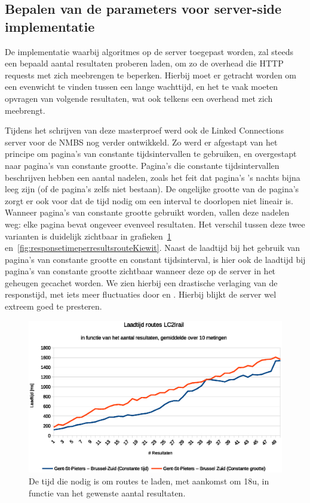 \subsection{Bepalen van de parameters voor server-side implementatie}

De implementatie waarbij algoritmes op de server toegepast worden, zal steeds een bepaald aantal resultaten proberen laden, om zo de overhead die HTTP requests met zich meebrengen te beperken. Hierbij moet er getracht worden om een evenwicht te vinden tussen een lange wachttijd, en het te vaak moeten opvragen van volgende resultaten, wat ook telkens een overhead met zich meebrengt.

Tijdens het schrijven van deze masterproef werd ook de Linked Connections server voor de NMBS nog verder ontwikkeld. Zo werd er afgestapt van het principe om pagina's van constante tijdsintervallen te gebruiken, en overgestapt naar pagina's van constante grootte. Pagina's die constante tijdsintervallen beschrijven hebben een aantal nadelen, zoals het feit dat pagina's 's nachts bijna leeg zijn (of de pagina's zelfs niet bestaan). De ongelijke grootte van de pagina's zorgt er ook voor dat de tijd nodig om een interval te doorlopen niet lineair is. Wanneer pagina's van constante grootte gebruikt worden, vallen deze nadelen weg: elke pagina bevat ongeveer evenveel resultaten. Het verschil tussen deze twee varianten is duidelijk zichtbaar in grafieken~\ref{fig:responsetimeperresultsrouteBruSouth} en~\ref{fig:responsetimeperresultsrouteKiewit}. Naast de laadtijd bij het gebruik van pagina's van constante grootte en constant tijdsinterval, is hier ook de laadtijd bij pagina's van constante grootte zichtbaar wanneer deze op de server in het geheugen gecachet worden. We zien hierbij een drastische verlaging van de responstijd, met iets meer fluctuaties door  en . Hierbij blijkt de server wel extreem goed te presteren.

\begin{figure}[h]
	\centering
	\includegraphics[width=1.00\textwidth]{images/Laadtijd_routes_Gent-St-Pieters_Brussel-Zuid.eps}
	
	\caption[Laadtijd routes tussen Gent en Brussel in functie van aantal resultaten]{De tijd die nodig is om routes te laden, met aankomst om 18u, in functie van het gewenste aantal resultaten.}
	\label{fig:responsetimeperresultsrouteBruSouth}
\end{figure} 

